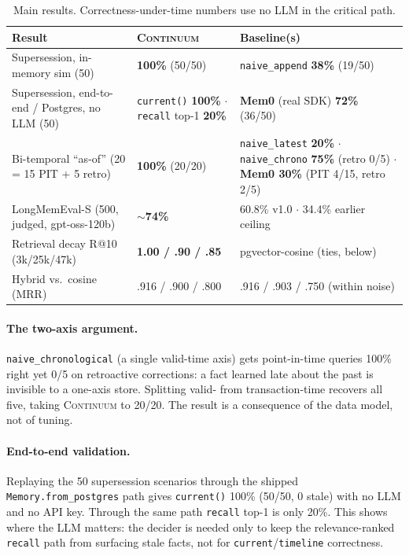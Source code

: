 \documentclass[11pt]{article}
\newcommand{\code}[1]{\texttt{#1}}
\begin{document}
\begin{table}[t]
\centering\small
\begin{tabular}{@{}p{5.0cm}p{4.3cm}p{4.6cm}@{}}
\toprule
\textbf{Result} & \textbf{\textsc{Continuum}} & \textbf{Baseline(s)} \\
\midrule
Supersession, in-memory sim (50) & \textbf{100\%} (50/50) & \code{naive\_append} \textbf{38\%} (19/50) \\
Supersession, end-to-end / Postgres, no LLM (50) & \code{current()} \textbf{100\%} $\cdot$ \code{recall} top-1 \textbf{20\%} & \textbf{Mem0} (real SDK) \textbf{72\%} (36/50) \\
Bi-temporal ``as-of'' (20 = 15 PIT + 5 retro) & \textbf{100\%} (20/20) & \code{naive\_latest} \textbf{20\%} $\cdot$ \code{naive\_chrono} \textbf{75\%} (retro 0/5) $\cdot$ \textbf{Mem0 30\%} (PIT 4/15, retro 2/5) \\
LongMemEval-S (500, judged, gpt-oss-120b) & \textbf{$\sim$74\%} & 60.8\% v1.0 $\cdot$ 34.4\% earlier ceiling \\
Retrieval decay R@10 (3k/25k/47k) & \textbf{1.00 / .90 / .85} & pgvector-cosine (ties, below) \\
Hybrid vs.\ cosine (MRR) & .916 / .900 / .800 & .916 / .903 / .750 (within noise) \\
\bottomrule
\end{tabular}
\caption{Main results. Correctness-under-time numbers use no LLM in the critical path.}
\label{tab:main}
\end{table}

\paragraph{The two-axis argument.} \code{naive\_chronological} (a single valid-time axis) gets
point-in-time queries 100\% right yet 0/5 on retroactive corrections: a fact learned late about the
past is invisible to a one-axis store. Splitting valid- from transaction-time recovers all five,
taking \textsc{Continuum} to 20/20. The result is a consequence of the data model, not of tuning.

\paragraph{End-to-end validation.} Replaying the 50 supersession scenarios through the shipped
\code{Memory.from\_postgres} path gives \code{current()} 100\% (50/50, 0 stale) with no LLM and no
API key. Through the same path \code{recall} top-1 is only 20\%. This shows where the LLM matters:
the decider is needed only to keep the relevance-ranked \code{recall} path from surfacing stale
facts, not for \code{current}/\code{timeline} correctness.
\end{document}
